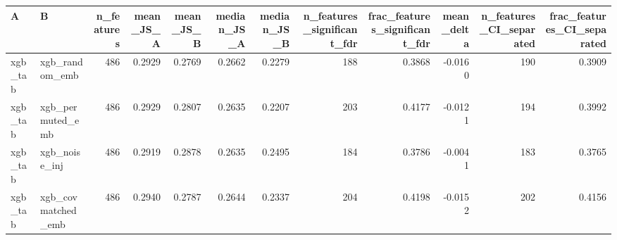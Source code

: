 \begin{tabular}{llrrrrrrrrrr}
\toprule
A & B & n\_features & mean\_JS\_A & mean\_JS\_B & median\_JS\_A & median\_JS\_B & n\_features\_significant\_fdr & frac\_features\_significant\_fdr & mean\_delta & n\_features\_CI\_separated & frac\_features\_CI\_separated \\
\midrule
xgb\_tab & xgb\_random\_emb & 486 & 0.2929 & 0.2769 & 0.2662 & 0.2279 & 188 & 0.3868 & -0.0160 & 190 & 0.3909 \\
xgb\_tab & xgb\_permuted\_emb & 486 & 0.2929 & 0.2807 & 0.2635 & 0.2207 & 203 & 0.4177 & -0.0121 & 194 & 0.3992 \\
xgb\_tab & xgb\_noise\_inj & 486 & 0.2919 & 0.2878 & 0.2635 & 0.2495 & 184 & 0.3786 & -0.0041 & 183 & 0.3765 \\
xgb\_tab & xgb\_covmatched\_emb & 486 & 0.2940 & 0.2787 & 0.2644 & 0.2337 & 204 & 0.4198 & -0.0152 & 202 & 0.4156 \\
\bottomrule
\end{tabular}
